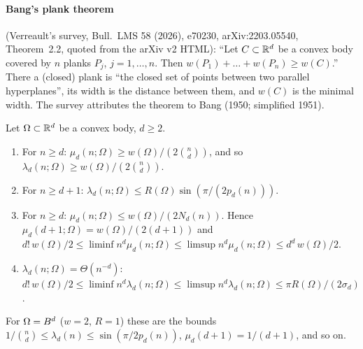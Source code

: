 \paragraph{Bang's plank theorem} (Verreault's survey, Bull.\ LMS 58 (2026), e70230, arXiv:2203.05540,
Theorem~2.2, quoted from the arXiv v2 HTML): ``Let $C\subset\mathbb{R}^d$ be a convex body covered by $n$ planks
$P_j$, $j=1,\dots,n$. Then $w(P_1)+\dots+w(P_n)\ge w(C)$.'' There a (closed) plank is ``the closed set
of points between two parallel hyperplanes'', its width is the distance between them, and $w(C)$ is the
minimal width. The survey attributes the theorem to Bang (1950; simplified 1951).

\begin{proposition}\label{D:convex}
Let $\Omega\subset\mathbb{R}^d$ be a convex body, $d\ge2$.
\begin{enumerate}[label=(\roman*)]
  \item For $n\ge d$: $\mu_d(n;\Omega)\ge w(\Omega)/(2\binom nd)$, and so $\lambda_d(n;\Omega)\ge w(\Omega)/(2\binom nd)$.
  \item For $n\ge d+1$: $\lambda_d(n;\Omega)\le R(\Omega)\sin(\pi/(2p_d(n)))$.
  \item For $n\ge d$: $\mu_d(n;\Omega)\le w(\Omega)/(2N_d(n))$. Hence $\mu_d(d+1;\Omega)=w(\Omega)/(2(d+1))$ and
    $d!\,w(\Omega)/2\le\liminf n^d\mu_d(n;\Omega)\le\limsup n^d\mu_d(n;\Omega)\le d^d\,w(\Omega)/2$.
  \item $\lambda_d(n;\Omega)=\Theta(n^{-d})$:
    $d!\,w(\Omega)/2\le\liminf n^d\lambda_d(n;\Omega)\le\limsup n^d\lambda_d(n;\Omega)\le\pi R(\Omega)/(2\sigma_d)$.
\end{enumerate}
\end{proposition}

For $\Omega=B^d$ ($w=2$, $R=1$) these are the bounds $1/\binom nd\le\lambda_d(n)\le\sin(\pi/2p_d(n))$,
$\mu_d(d+1)=1/(d+1)$, and so on.

